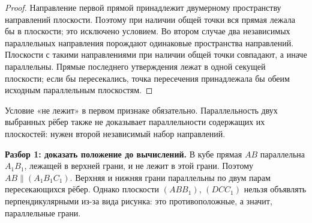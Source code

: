 \begin{proof}Направление первой прямой принадлежит двумерному пространству направлений плоскости. Поэтому при наличии общей точки вся прямая лежала бы в плоскости; это исключено условием. Во втором случае два независимых параллельных направления порождают одинаковые пространства направлений. Плоскости с такими направлениями при наличии общей точки совпадают, а иначе параллельны. Прямые последнего утверждения лежат в одной секущей плоскости; если бы пересекались, точка пересечения принадлежала бы обеим исходным параллельным плоскостям.\end{proof}
Условие «не лежит» в первом признаке обязательно. Параллельность двух выбранных рёбер также не доказывает параллельности содержащих их плоскостей: нужен второй независимый набор направлений.
\begin{example}\textbf{Разбор 1: доказать положение до вычислений.} В кубе прямая \(AB\) параллельна \(A_1B_1\), лежащей в верхней грани, и не лежит в этой грани. Поэтому \(AB\parallel(A_1B_1C_1)\). Верхняя и нижняя грани параллельны по двум парам пересекающихся рёбер. Однако плоскости \((ABB_1)\), \((DCC_1)\) нельзя объявлять перпендикулярными из-за вида рисунка: это противоположные, а значит, параллельные грани.\end{example}

